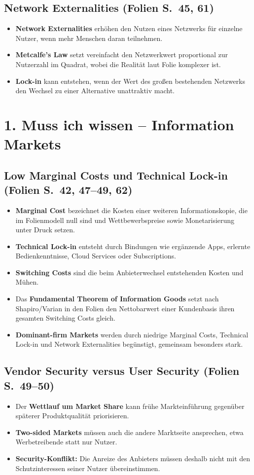 \documentclass[11pt,a4paper]{article}
\newcommand{\block}[2]{\subsection*{#1 {\normalfont\small (Folien S.~#2)}}}
\begin{document}
\block{Network Externalities}{45, 61}
\begin{itemize}
\item \textbf{Network Externalities} erhöhen den Nutzen eines Netzwerks für einzelne Nutzer, wenn mehr Menschen daran teilnehmen.
\item \textbf{Metcalfe's Law} setzt vereinfacht den Netzwerkwert proportional zur Nutzerzahl im Quadrat, wobei die Realität laut Folie komplexer ist.
\item \textbf{Lock-in} kann entstehen, wenn der Wert des großen bestehenden Netzwerks den Wechsel zu einer Alternative unattraktiv macht.
\end{itemize}

\newpage
\section*{1. Muss ich wissen -- Information Markets}
\block{Low Marginal Costs und Technical Lock-in}{42, 47--49, 62}
\begin{itemize}
\item \textbf{Marginal Cost} bezeichnet die Kosten einer weiteren Informationskopie, die im Folienmodell null sind und Wettbewerbspreise sowie Monetarisierung unter Druck setzen.
\item \textbf{Technical Lock-in} entsteht durch Bindungen wie ergänzende Apps, erlernte Bedienkenntnisse, Cloud Services oder Subscriptions.
\item \textbf{Switching Costs} sind die beim Anbieterwechsel entstehenden Kosten und Mühen.
\item Das \textbf{Fundamental Theorem of Information Goods} setzt nach Shapiro/Varian in den Folien den Nettobarwert einer Kundenbasis ihren gesamten Switching Costs gleich.
\item \textbf{Dominant-firm Markets} werden durch niedrige Marginal Costs, Technical Lock-in und Network Externalities begünstigt, gemeinsam besonders stark.
\end{itemize}
\block{Vendor Security versus User Security}{49--50}
\begin{itemize}
\item Der \textbf{Wettlauf um Market Share} kann frühe Markteinführung gegenüber späterer Produktqualität priorisieren.
\item \textbf{Two-sided Markets} müssen auch die andere Marktseite ansprechen, etwa Werbetreibende statt nur Nutzer.
\item \textbf{Security-Konflikt:} Die Anreize des Anbieters müssen deshalb nicht mit den Schutzinteressen seiner Nutzer übereinstimmen.
\end{itemize}
\end{document}
